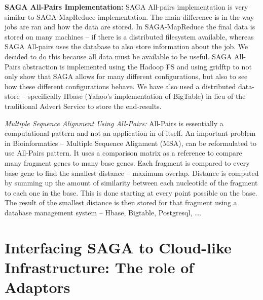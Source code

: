 \documentclass[conference,final]{IEEEtran}
\newcommand{\sagamapreduce }{SAGA-MapReduce }
\begin{document}

{\bf SAGA All-Pairs Implementation: } SAGA All-pairs implementation is
very similar to \sagamapreduce implementation.  The main difference is
in the way jobs are ran and how the data are stored.  In
\sagamapreduce the final data is stored on many machines -- if there
is a distributed filesystem available, whereas SAGA All-pairs uses the
database to also store information about the job.  We decided to do
this because all data must be available to be useful. SAGA All-Pairs
abstraction is implemented using the Hadoop FS and using
gridftp to not only show that SAGA allows for many different
configurations, but also to see how these different configurations
behave. We have also used a distributed data-store -- specifically
Hbase (Yahoo's implementation of BigTable) in lieu of the traditional
Advert Service to store the end-results.


{\it Multiple Sequence Alignment Using All-Pairs:} All-Pairs is
essentially a computational pattern and not an application in of
itself. An important problem in Bioinformatics -- Multiple Sequence
Alignment (MSA), can be reformulated to use All-Pairs pattern. It uses
a comparison matrix as a reference to compare many fragment genes to
many base genes.  Each fragment is compared to every base gene to find
the smallest distance -- maximum overlap.  Distance is computed by
summing up the amount of similarity between each nucleotide of the
fragment to each one in the base.  This is done starting at every
point possible on the base. The result of the smallest distance is
then stored for that fragment using a database management system --
Hbase, Bigtable, Postgresql, \ldots.


\section{Interfacing SAGA to Cloud-like Infrastructure: The role of
  Adaptors}
\end{document}
